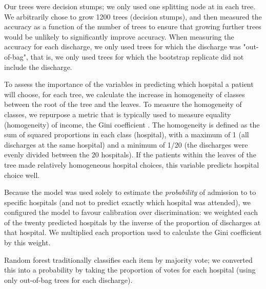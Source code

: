 \documentclass[]{article}\usepackage[]{graphicx}\usepackage[]{color}
\begin{document}
Our trees were decision stumps; we only used one splitting node at in each tree. We arbitrarily chose to grow 1200 trees (decision stumps), and then measured the accuracy as a function of the number of trees to ensure that growing further trees would be unlikely to significantly improve accuracy. When measuring the accuracy for each discharge, we only used trees for which the discharge was "out-of-bag", that is, we only used trees for which the bootstrap replicate did not include the discharge.

 
To assess the importance of the variables in predicting which hospital a patient will choose, for each tree, we calculate the increase in homogeneity of classes between the root of the tree and the leaves. To measure the homogeneity of classes, we repurpose a metric that is typically used to measure equality (homogeneity) of income, the Gini coefficient \supercite{gini_variabilita_1912}. The homogeneity is defined as the sum of squared proportions in each class (hospital), with a maximum of 1 (all discharges at the same hospital) and a minimum of 1/20 (the discharges were evenly divided between the 20 hospitals). If the patients within the leaves of the tree made relatively homogeneous hospital choices, this variable predicts hospital choice well.

Because the model was used solely to estimate the \emph{probability} of admission to to specific hospitals (and not to predict exactly which hospital was attended), we configured the model to favour calibration over discrimination: we weighted each of the twenty predicted hospitals by the inverse of the proportion of discharges at that hospital. We multiplied each proportion used to calculate the Gini coefficient by this weight.

Random forest traditionally classifies each item by majority vote; we converted this into a probability by taking the proportion of votes for each hospital (using only out-of-bag trees for each discharge).
\end{document}
